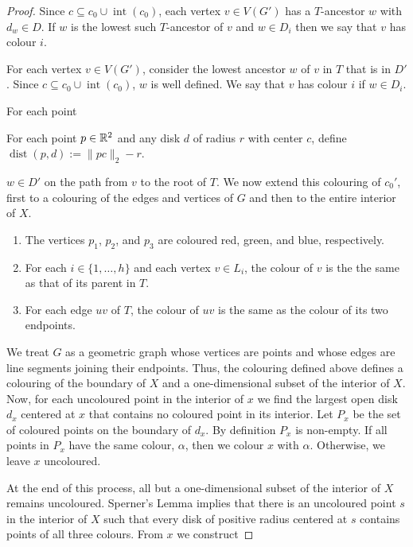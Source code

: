 \documentclass{patmorin}
\DeclareMathOperator{\dist}{dist}
\DeclareMathOperator{\interior}{int}
\begin{document}
\begin{proof}
  Since $c\subseteq c_0\cup\interior(c_0)$, each vertex $v\in V(G')$ has a $T$-ancestor $w$ with $d_w\in D$.  If $w$ is the lowest such $T$-ancestor of $v$ and $w\in D_i$ then we say that $v$ has colour $i$.
  
  
  
  For each vertex $v\in V(G')$, consider the lowest ancestor $w$ of $v$ in $T$ that is in $D'$.  Since $c\subseteq c_0\cup\interior(c_0)$, $w$ is well defined.  We say that $v$ has colour $i$ if $w\in D_i$.  
  
  For each point 
  
  
  
  For each point $p\in\mathbb{R}^2$ and any disk $d$ of radius $r$ with center $c$, define $\dist(p,d):=\|pc\|_2-r$.  
  
  
    $w\in D'$ on the path from $v$ to the root of $T$.
We now extend this colouring of $c_0'$, first to a colouring of the edges and vertices of $G$ and then to the entire interior of $X$. 
\begin{enumerate}
  \item The vertices $p_1$, $p_2$, and $p_3$ are coloured red, green, and blue, respectively.
  \item For each $i\in\{1,\ldots,h\}$ and each vertex $v\in L_i$, the colour of $v$ is the the same as that of its parent in $T$.
  \item For each edge $uv$ of $T$, the colour of $uv$ is the same as the colour of its two endpoints.
\end{enumerate}

We treat $G$ as a geometric graph whose vertices are points and whose edges are line segments joining their endpoints.  Thus, the colouring defined above defines a colouring of the boundary of $X$ and a one-dimensional subset of the interior of $X$.  Now, for each uncoloured point in the interior of $x$ we find the largest open disk $d_x$ centered at $x$ that contains no coloured point in its interior.  Let $P_x$ be the set of coloured points on the boundary of $d_x$.  By definition $P_x$ is non-empty.  If all points in $P_x$ have the same colour, $\alpha$, then we colour $x$ with $\alpha$. Otherwise, we leave $x$ uncoloured.  

At the end of this process, all but a one-dimensional subset of the interior of $X$ remains uncoloured.  Sperner's Lemma implies that there is an uncoloured point $s$ in the interior of $X$ such that every disk of positive radius centered at $s$ contains points of all three colours.  From $x$ we construct 

\end{proof}





\end{document}
